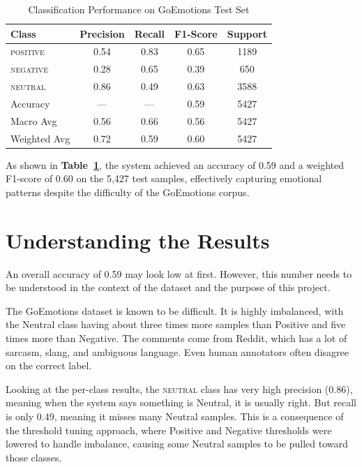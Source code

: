 \begin{table}[H]
\centering
\caption{Classification Performance on GoEmotions Test Set}
\label{tab:classperf}
\begin{tabular}{lcccc}
\toprule
\textbf{Class} & \textbf{Precision} & \textbf{Recall} & \textbf{F1-Score} & \textbf{Support} \\
\midrule
\textsc{positive} & 0.54 & 0.83 & 0.65 & 1189 \\
\textsc{negative} & 0.28 & 0.65 & 0.39 & 650  \\
\textsc{neutral}  & 0.86 & 0.49 & 0.63 & 3588 \\
\midrule
Accuracy          & ---  & ---  & 0.59 & 5427 \\
Macro Avg         & 0.56 & 0.66 & 0.56 & 5427 \\
Weighted Avg      & 0.72 & 0.59 & 0.60 & 5427 \\
\bottomrule
\end{tabular}
\end{table}

As shown in \textbf{Table~\ref{tab:classperf}}, the system achieved an accuracy of 0.59 and a weighted
F1-score of 0.60 on the 5,427 test samples, effectively capturing emotional patterns despite the
difficulty of the GoEmotions corpus.

\section{Understanding the Results}

An overall accuracy of 0.59 may look low at first. However, this number needs to be understood
in the context of the dataset and the purpose of this project.

The GoEmotions dataset is known to be difficult. It is highly imbalanced, with the Neutral class
having about three times more samples than Positive and five times more than Negative. The
comments come from Reddit, which has a lot of sarcasm, slang, and ambiguous language. Even
human annotators often disagree on the correct label.

Looking at the per-class results, the \textsc{neutral} class has very high precision (0.86),
meaning when the system says something is Neutral, it is usually right. But recall is only 0.49,
meaning it misses many Neutral samples. This is a consequence of the threshold tuning
approach, where Positive and Negative thresholds were lowered to handle imbalance, causing
some Neutral samples to be pulled toward those classes.

